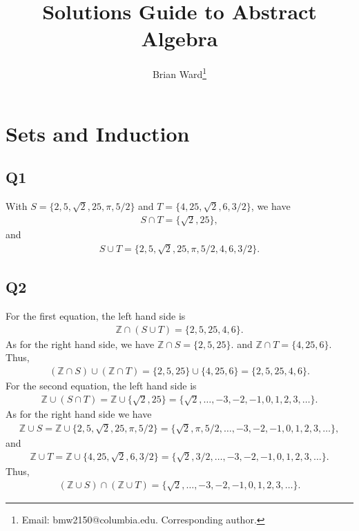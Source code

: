 \documentclass[12pt]{article}
\numberwithin{theorem}{section}
\numberwithin{equation}{section}
\numberwithin{remark}{section}
\numberwithin{definition}{section}
\numberwithin{theorem}{section}
\numberwithin{lemma}{section}
\numberwithin{example}{section}
\begin{document}
\title{Solutions Guide to Abstract Algebra}
\author{Brian Ward\thanks{Email: {bmw2150@columbia.edu}. Corresponding author. }} 
\maketitle
{}

\tableofcontents

\newpage

\setcounter{section}{-1}

\section{Sets and Induction}



\subsection{Q1}
With $S = \{2,5,\sqrt{2},25,\pi,5/2\}$ and $T=\{4,25,\sqrt{2},6,3/2\}$, we have 
\begin{align*}
	S\cap T = \{\sqrt{2},25\},
\end{align*}
and 
\begin{align*}
	S\cup T = \{2,5,\sqrt{2},25,\pi,5/2,4,6,3/2\}.
\end{align*}



\subsection{Q2}
For the first equation, the left hand side is
\begin{align*}
	\mathbb{Z} \cap \left(S\cup T \right) = \{2,5,25,4,6\}.
\end{align*}
As for the right hand side, we have $\mathbb{Z}\cap S = \{2,5,25\}$. and $\mathbb{Z}\cap T = \{4,25,6\}$. Thus, 
\begin{align*}
	\left(\mathbb{Z}\cap S\right)\cup\left(\mathbb{Z}\cap T\right) = \{2,5,25\} \cup \{4,25,6\} = \{2,5,25,4,6\}.
\end{align*}
For the second equation, the left hand side is
\begin{align*}
	\mathbb{Z} \cup \left(S\cap T \right) = \mathbb{Z} \cup \{\sqrt{2},25\} = \{\sqrt{2},\ldots,-3,-2,-1,0,1,2,3,\ldots\}.
\end{align*}
As for the right hand side we have 
\begin{align*}
	\mathbb{Z} \cup S = \mathbb{Z} \cup  \{2,5,\sqrt{2},25,\pi,5/2\} = \{\sqrt{2},\pi,5/2,\ldots,-3,-2,-1,0,1,2,3,\ldots\},
\end{align*}
and
\begin{align*}
	\mathbb{Z} \cup T = \mathbb{Z} \cup \{4,25,\sqrt{2},6,3/2\} = \{\sqrt{2},3/2,\ldots,-3,-2,-1,0,1,2,3,\ldots\}.
\end{align*}
Thus,
\begin{align*}
	\left(\mathbb{Z}\cup S\right)\cap\left(\mathbb{Z}\cup T\right) = \{\sqrt{2},\ldots,-3,-2,-1,0,1,2,3,\ldots\}.
\end{align*}
\end{document}
